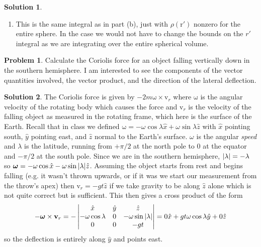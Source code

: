 \documentclass[10pt]{article}
\theoremstyle{definition}
\newtheorem{problem}{Problem}
\newtheorem{soln}{Solution}
\newcommand{\ux}{\hat{x}}
\newcommand{\uy}{\hat{y}}
\newcommand{\uz}{\hat{z}}
\newcommand{\bv}[1]{\bm{\mathrm{#1}}}
\begin{document}
\begin{soln}
\begin{enumerate}[label=(\alph*)]
          where I've assumed the shell has surface mass density $\sigma$ and radius $R$. Again this integral is the same inside and out, the values of $x,y,z$ will just change.
    \item This is the same integral as in part (b), just with $\rho(\bv{r}')$ nonzero for the entire sphere. In the case we would not have to change the bounds
          on the $r'$ integral as we are integrating over the entire spherical volume.
  \end{enumerate}
\end{soln}

\begin{problem}
Calculate the Coriolis force for an object falling vertically down in the southern
hemisphere. I am interested to see the components of the vector quantities involved, the
vector product, and the direction of the lateral deflection.
\end{problem}
\begin{soln}
  The Coriolis force is given by $-2m\bv{\omega}\times \bv{v}_r$ where
  $\bv{\omega}$ is the angular velocity of the rotating body which causes the force and
  $\bv{v}_r$ is the velocity of the falling object as measured in the rotating frame, which here is the surface of the Earth.
  Recall that in class we defined $\bv{\omega}=-\omega\cos\lambda\ux+\omega\sin\lambda\uz$ with $\ux$ pointing south, $\uy$ pointing east, and $\uz$ normal to the Earth's surface.
  $\omega$ is the angular \emph{speed} and $\lambda$ is the latitude, running from $+\pi/2$ at the north pole to $0$ at the equator and $-\pi/2$ at the south pole.
  Since we are in the southern hemisphere, $\abs{\lambda}=-\lambda$ so $\bv{\omega}=-\omega\cos\ux-\omega\sin\abs{\lambda}\uz$. Assuming the object starts
  from rest and begins falling (e.g. it wasn't thrown upwards, or if it was we start our measurement from the throw's apex) then $\bv{v}_r=-gt\uz$
  if we take gravity to be along $\uz$ alone which is not quite correct but is sufficient. This then gives a cross product of the form
  $$-\bv{\omega}\times\bv{v}_r=-\begin{vmatrix}
      \ux                & \uy & \uz                      \\
      -\omega\cos\lambda & 0   & -\omega\sin\abs{\lambda} \\
      0                  & 0   & -gt                      \\
    \end{vmatrix}=0\ux+gt\omega\cos\lambda\uy+0\uz$$
  so the deflection is entirely along $\uy$ and points east.
\end{soln}
\end{document}
